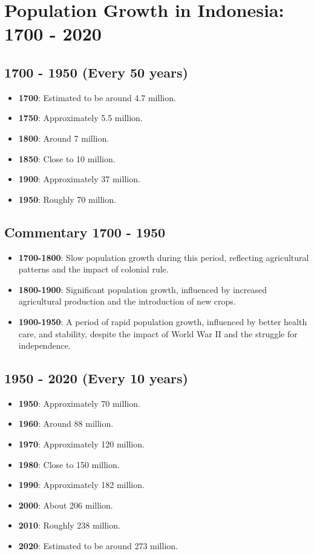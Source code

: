 \section{Population Growth in Indonesia: 1700 - 2020}

\subsection*{1700 - 1950 (Every 50 years)}
\begin{itemize}
    \item \textbf{1700}: Estimated to be around 4.7 million.
    \item \textbf{1750}: Approximately 5.5 million.
    \item \textbf{1800}: Around 7 million.
    \item \textbf{1850}: Close to 10 million.
    \item \textbf{1900}: Approximately 37 million.
    \item \textbf{1950}: Roughly 70 million.
\end{itemize}

\subsection*{Commentary 1700 - 1950}
\begin{itemize}
    \item \textbf{1700-1800}: Slow population growth during this period, reflecting agricultural patterns and the impact of colonial rule.
    \item \textbf{1800-1900}: Significant population growth, influenced by increased agricultural production and the introduction of new crops.
    \item \textbf{1900-1950}: A period of rapid population growth, influenced by better health care, and stability, despite the impact of World War II and the struggle for independence.
\end{itemize}

\subsection*{1950 - 2020 (Every 10 years)}
\begin{itemize}
    \item \textbf{1950}: Approximately 70 million.
    \item \textbf{1960}: Around 88 million.
    \item \textbf{1970}: Approximately 120 million.
    \item \textbf{1980}: Close to 150 million.
    \item \textbf{1990}: Approximately 182 million.
    \item \textbf{2000}: About 206 million.
    \item \textbf{2010}: Roughly 238 million.
    \item \textbf{2020}: Estimated to be around 273 million.
\end{itemize}


